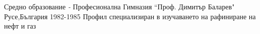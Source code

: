 \vspace{+3mm}
\cventry
{Средно образование \textit{-} Професионална Гимназия “Проф. Димитър Баларев"}
{Русе,България 1982-1985}
{
Профил специализиран в изучаването на рафиниране на нефт и газ
}
\vspace{+3mm}